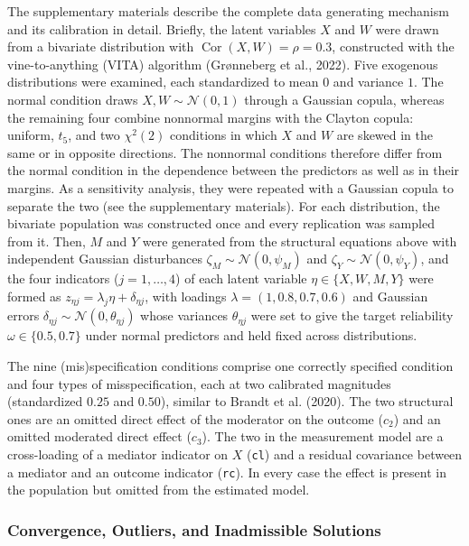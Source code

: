\documentclass[
  man,
  longtable,
  nolmodern,
  notxfonts,
  notimes,
  colorlinks=true,linkcolor=blue,citecolor=blue,urlcolor=blue]{apa7}
\begin{document}
The supplementary materials describe the complete data generating
mechanism and its calibration in detail. Briefly, the latent variables
\(X\) and \(W\) were drawn from a bivariate distribution with
\(\operatorname{Cor}(X, W) = \rho = 0.3\), constructed with the
vine-to-anything (VITA) algorithm (Grønneberg et al., 2022). Five
exogenous distributions were examined, each standardized to mean \(0\)
and variance \(1\). The normal condition draws
\(X, W \sim \mathcal{N}(0, 1)\) through a Gaussian copula, whereas the
remaining four combine nonnormal margins with the Clayton copula:
uniform, \(t_5\), and two \(\chi^2(2)\) conditions in which \(X\) and
\(W\) are skewed in the same or in opposite directions. The nonnormal
conditions therefore differ from the normal condition in the dependence
between the predictors as well as in their margins. As a sensitivity
analysis, they were repeated with a Gaussian copula to separate the two
(see the supplementary materials). For each distribution, the bivariate
population was constructed once and every replication was sampled from
it. Then, \(M\) and \(Y\) were generated from the structural equations
above with independent Gaussian disturbances
\(\zeta_M \sim \mathcal{N}(0, \psi_M)\) and
\(\zeta_Y \sim \mathcal{N}(0, \psi_Y)\), and the four indicators
(\(j = 1, \dots, 4\)) of each latent variable
\(\eta \in \{X, W, M, Y\}\) were formed as
\(z_{\eta j} = \lambda_j \eta + \delta_{\eta j}\), with loadings
\(\lambda = (1, 0.8, 0.7, 0.6)\) and Gaussian errors
\(\delta_{\eta j} \sim \mathcal{N}(0, \theta_{\eta j})\) whose variances
\(\theta_{\eta j}\) were set to give the target reliability
\(\omega \in \{0.5, 0.7\}\) under normal predictors and held fixed
across distributions.

The nine (mis)specification conditions comprise one correctly specified
condition and four types of misspecification, each at two calibrated
magnitudes (standardized \(0.25\) and \(0.50\)), similar to Brandt et
al. (2020). The two structural ones are an omitted direct effect of the
moderator on the outcome (\(c_2\)) and an omitted moderated direct
effect (\(c_3\)). The two in the measurement model are a cross-loading
of a mediator indicator on \(X\) (\texttt{cl}) and a residual covariance
between a mediator and an outcome indicator (\texttt{rc}). In every case
the effect is present in the population but omitted from the estimated
model.

\subsubsection{Convergence, Outliers, and Inadmissible
Solutions}\label{convergence-outliers-and-inadmissible-solutions}
\end{document}
